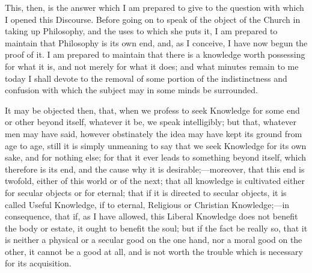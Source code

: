 This, then, is the answer which I am prepared to give to the
question with which I opened this Discourse. Before going on to speak
of the object of the Church in taking up Philosophy, and the uses to
which she puts it, I am prepared to maintain that Philosophy is its
own end, and, as I conceive, I have now begun the proof of it. I am
prepared to maintain that there is a knowledge worth possessing for
what it is, and not merely for what it does; and what minutes remain
to me today I shall devote to the removal of some portion of the
indistinctness and confusion with which the subject may in some minds
be surrounded.

It may be objected then, that, when we profess to seek Knowledge
for some end or other beyond itself, whatever it be, we speak
intelligibly; but that, whatever men may have said, however
obstinately the idea may have kept its ground from age to age, still
it is simply unmeaning to say that we seek Knowledge for its own
sake, and for nothing else; for that it ever leads to something beyond
itself, which therefore is its end, and the cause why it is desirable;—moreover,
that this end is twofold, either of this world or of the next; that
all knowledge is cultivated either for secular objects or for eternal;
that if it is directed to secular objects, it is called Useful
Knowledge, if to eternal, Religious or Christian Knowledge;—in
consequence, that if, as I have allowed, this Liberal Knowledge does
not benefit the body or estate, it ought to benefit the soul; but if
the fact be really so, that it is neither a physical or a secular good
on the one hand, nor a moral good on the other, it cannot be a good at
all, and is not worth the trouble which is necessary for its
acquisition.

